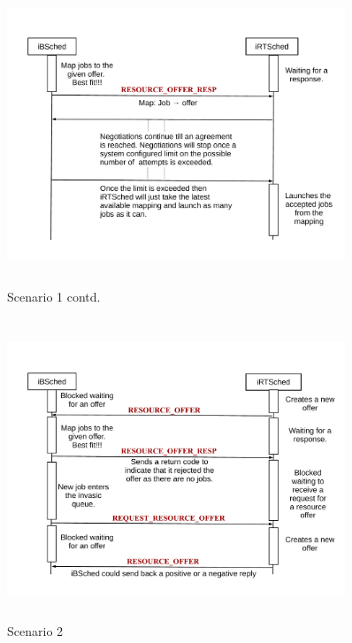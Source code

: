 \begin{figure}[!t]
\vspace{-0.25in}
\centering
\includegraphics[width=0.9\textwidth, height=90mm]{./figures/scenario1contd.pdf}
\caption{Scenario 1 contd.}
\label{fig:Seq2}
\end{figure}
\begin{figure}[!b]
\centering
\includegraphics[width=0.9\textwidth, height=90mm]{./figures/scenario2.pdf}
\caption{Scenario 2}
\label{fig:Seq3}
\end{figure}
\clearpage
